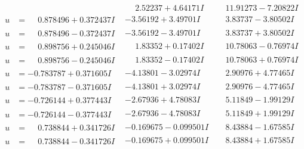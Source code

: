 \documentclass[1p]{elsarticle_modified}
\theoremstyle{definition}
\begin{document}
$$\begin{array}{c|c|c}
 & \phantom{-}2.52237 + 4.64171 I & \phantom{-}11.91273 - 7.20822 I \\ \hline\begin{aligned}
u &= \phantom{-}0.878496 + 0.372437 I\end{aligned}
 & -3.56192 + 3.49701 I & \phantom{-}3.83737 - 3.80502 I \\ \hline\begin{aligned}
u &= \phantom{-}0.878496 - 0.372437 I\end{aligned}
 & -3.56192 - 3.49701 I & \phantom{-}3.83737 + 3.80502 I \\ \hline\begin{aligned}
u &= \phantom{-}0.898756 + 0.245046 I\end{aligned}
 & \phantom{-}1.83352 + 0.17402 I & \phantom{-}10.78063 - 0.76974 I \\ \hline\begin{aligned}
u &= \phantom{-}0.898756 - 0.245046 I\end{aligned}
 & \phantom{-}1.83352 - 0.17402 I & \phantom{-}10.78063 + 0.76974 I \\ \hline\begin{aligned}
u &= -0.783787 + 0.371605 I\end{aligned}
 & -4.13801 - 3.02974 I & \phantom{-}2.90976 + 4.77465 I \\ \hline\begin{aligned}
u &= -0.783787 - 0.371605 I\end{aligned}
 & -4.13801 + 3.02974 I & \phantom{-}2.90976 - 4.77465 I \\ \hline\begin{aligned}
u &= -0.726144 + 0.377443 I\end{aligned}
 & -2.67936 + 4.78083 I & \phantom{-}5.11849 - 1.99129 I \\ \hline\begin{aligned}
u &= -0.726144 - 0.377443 I\end{aligned}
 & -2.67936 - 4.78083 I & \phantom{-}5.11849 + 1.99129 I \\ \hline\begin{aligned}
u &= \phantom{-}0.738844 + 0.341726 I\end{aligned}
 & -0.169675 - 0.099501 I & \phantom{-}8.43884 - 1.67585 I \\ \hline\begin{aligned}
u &= \phantom{-}0.738844 - 0.341726 I\end{aligned}
 & -0.169675 + 0.099501 I & \phantom{-}8.43884 + 1.67585 I \\ \hline\begin{aligned}

\end{aligned}
\end{array}$$
\end{document}
